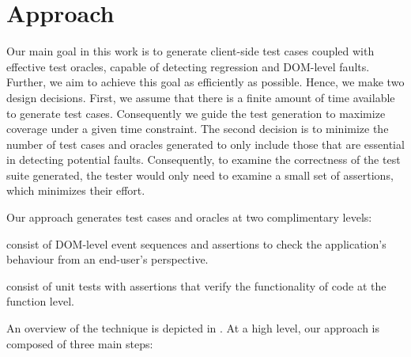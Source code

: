 \section{Approach} \label{Sec:approach}
Our main goal in this work is to generate client-side test cases coupled with
effective test oracles, capable of detecting regression \javascript and DOM-level faults. 
Further, we aim to achieve this goal as efficiently as possible. Hence, we make two design decisions. First, we assume that there is a finite amount of time available to generate test cases. Consequently we guide the test generation  to maximize coverage under a given time constraint. 
The second decision is to minimize the number of test cases and oracles generated to only include those that are essential in detecting potential faults. %
Consequently, to examine the correctness of the test suite generated, the tester would only need to examine a small set of assertions, which minimizes their effort.

Our approach generates test cases and oracles at two complimentary levels:
\begin{description}
\item[DOM-level event-based tests] consist of DOM-level event sequences and assertions to check the application's behaviour from an end-user's perspective. 
\item[Function-level unit tests]  consist of unit tests with assertions that verify the functionality of \javascript code at the function level.
\end{description}

An overview of the technique is depicted in . 
At a high level, our approach is composed of three main steps:

